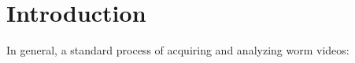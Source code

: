 \documentclass[main.tex]{subfiles}
\begin{document}
\section{Introduction}


In general, a standard process of acquiring and analyzing worm videos: 
\end{document}
